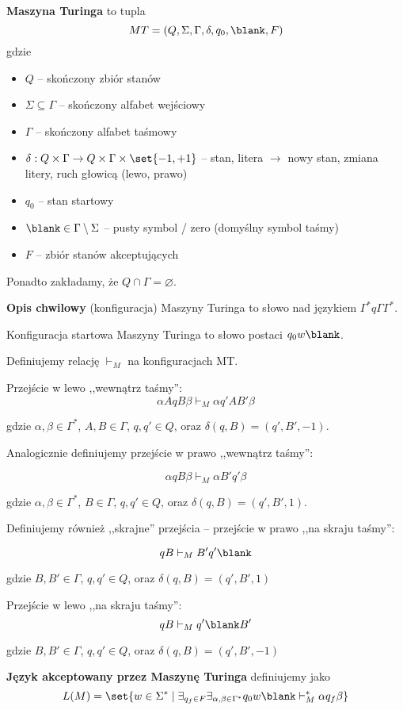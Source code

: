 \label{dmt}
\begin{definition}

	\textbf{Maszyna Turinga} to tupla
	\[
		MT = (Q, \Sigma, \Gamma, \delta, q_0, \blank, F)
	\]
	gdzie
	\begin{itemize}
		\item \( Q \) -- skończony zbiór stanów
		\item \( \Sigma \subseteq \Gamma \) -- skończony alfabet wejściowy
		\item \( \Gamma \) -- skończony alfabet taśmowy
		\item \( \delta : Q \times \Gamma \rightarrow
		      Q \times \Gamma \times \set{-1, +1}
		      \) -- stan, litera \( \rightarrow \) nowy stan, zmiana litery, ruch głowicą (lewo, prawo)
		\item \( q_0 \) -- stan startowy
		\item \( \blank \in \Gamma \setminus \Sigma \) -- pusty symbol / zero (domyślny symbol taśmy)
		\item \( F \) -- zbiór stanów akceptujących
	\end{itemize}

	Ponadto zakładamy, że \(Q \cap \Gamma = \varnothing\).
\end{definition}

\begin{definition}
	\textbf{Opis chwilowy} (konfiguracja) Maszyny Turinga to słowo nad językiem \(\Gamma^* q\Gamma \Gamma^* \).
\end{definition}

\begin{definition}
	Konfiguracja startowa Maszyny Turinga to słowo postaci \(q_0w\blank\).
\end{definition}

\begin{definition}
	Definiujemy relację \( \vdash_M \) na konfiguracjach MT.

	Przejście w lewo ,,wewnątrz taśmy'':
	\[
		\alpha A q B \beta
		\vdash_M
		\alpha q' A B' \beta
	\]

	gdzie \(\alpha, \beta \in \Gamma^*\), \(A, B \in \Gamma\), \(q, q'\in Q\), oraz \(\delta(q, B) = (q', B', -1)\).

	Analogicznie definiujemy przejście w prawo ,,wewnątrz taśmy'':

	\[
		\alpha q B \beta
		\vdash_M
		\alpha B' q' \beta
	\]

	gdzie \(\alpha, \beta \in \Gamma^*\), \(B \in \Gamma\), \(q, q'\in Q\), oraz \(   \delta(q, B) = (q', B', 1) \).

	Definiujemy również ,,skrajne'' przejścia -- przejście w prawo ,,na skraju taśmy'':

	\[
		q B
		\vdash_M
		B' q' \blank
	\]

	gdzie \(B, B' \in \Gamma\), \(q, q' \in Q\), oraz \( \delta(q, B) = (q', B', 1) \)

	Przejście w lewo ,,na skraju taśmy'':
	\[
		q B
		\vdash_M
		q' \blank B'
	\]

	gdzie \(B, B' \in \Gamma\), \(q, q' \in Q\), oraz \( \delta(q, B) = (q', B', -1)\)


\end{definition}


\begin{definition}
	\textbf{Język akceptowany przez Maszynę Turinga} definiujemy jako
	\[
		L(M) = \set{w \in \Sigma^* \mid \exists_{q_f \in F} \exists_{\alpha, \beta \in \Gamma^*} q_0w\blank \vdash_M^* \alpha q_f \beta}
	\]
\end{definition}

